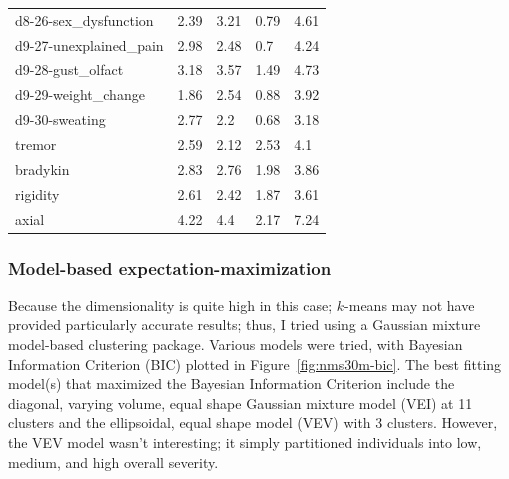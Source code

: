 \documentclass[10pt]{article}
\begin{document}
\begin{multicols}{2}
\begin{table}[b]
\begin{tabular}{l|l|l|l|l}
d8-26-sex\_dysfunction & 2.39 & 3.21 & 0.79 & 4.61 \\
d9-27-unexplained\_pain & 2.98 & 2.48 & 0.7 & 4.24 \\
d9-28-gust\_olfact & 3.18 & 3.57 & 1.49 & 4.73 \\
d9-29-weight\_change & 1.86 & 2.54 & 0.88 & 3.92 \\
d9-30-sweating & 2.77 & 2.2 & 0.68 & 3.18 \\
\hline
tremor & 2.59 & 2.12 & 2.53 & 4.1 \\
bradykin & 2.83 & 2.76 & 1.98 & 3.86 \\
rigidity & 2.61 & 2.42 & 1.87 & 3.61 \\
axial & 4.22 & 4.4 & 2.17 & 7.24 \\
  \end{tabular}
\end{table}

\subsubsection{Model-based expectation-maximization}

Because the dimensionality is quite high in this case; $k$-means may not have provided particularly
accurate results; thus, I tried using a Gaussian mixture model-based clustering package. Various
models were tried, with Bayesian Information Criterion (BIC) plotted in
Figure~\ref{fig:nms30m-bic}. The best
fitting model(s) that maximized the Bayesian Information Criterion include the diagonal, varying
volume, equal shape Gaussian mixture model (VEI) at 11 clusters and the ellipsoidal, equal shape
model (VEV) with 3 clusters. However, the VEV model wasn't interesting; it simply partitioned
individuals into low, medium, and high overall severity.


\end{multicols}
\end{document}
